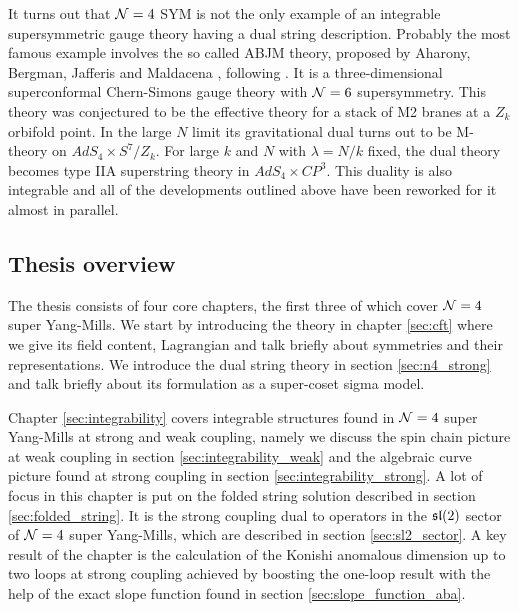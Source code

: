 It turns out that $\mathcal{N}=4$ SYM is not the only example of an integrable supersymmetric gauge theory having a dual string description.
Probably the most famous example involves the so called ABJM theory, proposed by Aharony, Bergman, Jafferis and Maldacena \cite{Aharony:2008ug}, following \cite{Schwarz:2004yj, Bagger:2006sk, Gaiotto:2007qi}.
It is a three-dimensional superconformal Chern-Simons gauge theory with $\mathcal{N}=6$ supersymmetry.
This theory was conjectured to be the effective theory for a stack of M2 branes at a $Z_k$ orbifold
point. 
In the large $N$ limit its gravitational dual turns out to be M-theory on $AdS_4 \times S^7 / Z_k$. 
For large $k$ and $N$ with $\lambda = N/k$ fixed, the dual theory becomes type IIA superstring theory in $AdS_4 \times CP^3$.
This duality is also integrable \cite{Minahan:2008hf} and all of the developments outlined above have been reworked for it almost in parallel. 

\newpage
\subsection{Thesis overview}

The thesis consists of four core chapters, the first three of which cover $\mathcal{N}=4$ super Yang-Mills.
We start by introducing the theory in chapter \ref{sec:cft} where we give its field content, Lagrangian and talk briefly about symmetries and their representations.
We introduce the dual string theory in section \ref{sec:n4_strong} and talk briefly about its formulation as a super-coset sigma model.

Chapter \ref{sec:integrability} covers integrable structures found in $\mathcal{N}=4$ super Yang-Mills at strong and weak coupling, namely we discuss the spin chain picture at weak coupling in section \ref{sec:integrability_weak} and the algebraic curve picture found at strong coupling in section \ref{sec:integrability_strong}.
A lot of focus in this chapter is put on the folded string solution described in section \ref{sec:folded_string}. 
It is the strong coupling dual to operators in the $\mathfrak{sl}(2)$ sector of $\mathcal{N}=4$ super Yang-Mills, which are described in section \ref{sec:sl2_sector}. 
A key result of the chapter is the calculation of the Konishi anomalous dimension up to two loops at strong coupling achieved by boosting the one-loop result with the help of the exact slope function found in section \ref{sec:slope_function_aba}.

